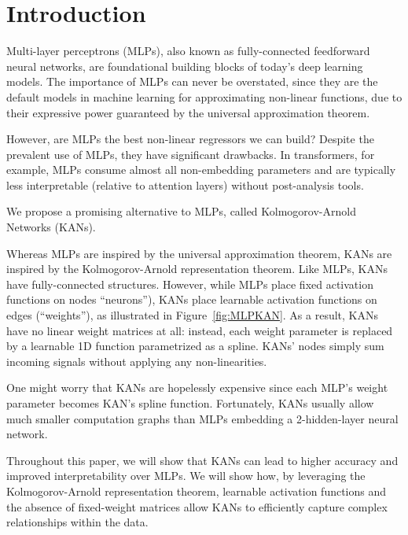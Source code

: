 \documentclass[12pt,a4paper]{article}
\begin{document}


\section{Introduction}
\label{sec:in}
Multi-layer perceptrons (MLPs), also known as fully-connected feedforward neural networks, are foundational building blocks of today’s deep learning models. The importance of MLPs can never be overstated, since they are the default models in machine learning for approximating non-linear functions, due to their expressive power guaranteed by the universal approximation theorem. 

However, are MLPs the best non-linear regressors we can build? Despite the prevalent use of MLPs, they have significant drawbacks. In transformers, for example, MLPs consume almost all non-embedding parameters and are typically less interpretable (relative to attention layers) without post-analysis tools.

We propose a promising alternative to MLPs, called Kolmogorov-Arnold Networks (KANs). 

Whereas MLPs are inspired by the universal approximation theorem, KANs are inspired by the Kolmogorov-Arnold representation theorem. Like MLPs, KANs have fully-connected structures. However, while MLPs place fixed activation functions on nodes “neurons”), KANs place learnable activation functions on edges (“weights”), as illustrated in Figure~\ref{fig:MLPKAN}. As a result, KANs have no linear weight matrices at all: instead, each weight parameter is replaced by a learnable 1D function parametrized as a spline. KANs’ nodes simply sum incoming signals without applying any non-linearities. 

One might worry that KANs are hopelessly expensive since each MLP’s weight parameter becomes KAN’s spline function. Fortunately, KANs usually allow much smaller computation graphs than MLPs embedding a 2-hidden-layer neural network.

Throughout this paper, we will show that KANs can lead to higher accuracy and improved interpretability over MLPs. We will show how, by leveraging the Kolmogorov-Arnold representation theorem, learnable activation functions and the absence of fixed-weight matrices allow KANs to efficiently capture complex relationships within the data\cite{KAN}.
\end{document}
